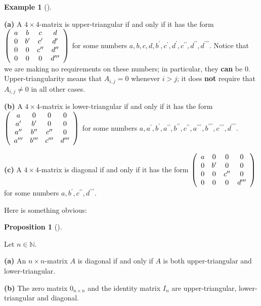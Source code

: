 \documentclass[numbers=enddot,12pt,final,onecolumn,notitlepage]{scrartcl}%
\theoremstyle{definition}
\newtheorem{prop}[theo]{Proposition}
\newenvironment{proposition}[1][]
{\begin{prop}[#1]\begin{leftbar}}
{\end{leftbar}\end{prop}}
\newtheorem{exam}[theo]{Example}
\newenvironment{example}[1][]
{\begin{exam}[#1]\begin{leftbar}}
{\end{leftbar}\end{exam}}
\begin{document}
\begin{example}
\label{exam.triangular}\textbf{(a)} A $4\times4$-matrix is upper-triangular if
and only if it has the form $\left(
\begin{array}
[c]{cccc}%
a & b & c & d\\
0 & b^{\prime} & c^{\prime} & d^{\prime}\\
0 & 0 & c^{\prime\prime} & d^{\prime\prime}\\
0 & 0 & 0 & d^{\prime\prime\prime}%
\end{array}
\right)  $ for some numbers $a,b,c,d,b^{\prime},c^{\prime},d^{\prime
},c^{\prime\prime},d^{\prime\prime},d^{\prime\prime\prime}$. Notice that we
are making no requirements on these numbers; in particular, they \textbf{can}
be $0$. Upper-triangularity means that $A_{i,j}=0$ whenever $i>j$; it does
\textbf{not} require that $A_{i,j}\neq0$ in all other cases.

\textbf{(b)} A $4\times4$-matrix is lower-triangular if and only if it has the
form $\left(
\begin{array}
[c]{cccc}%
a & 0 & 0 & 0\\
a^{\prime} & b^{\prime} & 0 & 0\\
a^{\prime\prime} & b^{\prime\prime} & c^{\prime\prime} & 0\\
a^{\prime\prime\prime} & b^{\prime\prime\prime} & c^{\prime\prime\prime} &
d^{\prime\prime\prime}%
\end{array}
\right)  $ for some numbers $a,a^{\prime},b^{\prime},a^{\prime\prime
},b^{\prime\prime},c^{\prime\prime},a^{\prime\prime\prime},b^{\prime
\prime\prime},c^{\prime\prime\prime},d^{\prime\prime\prime}$.

\textbf{(c)} A $4\times4$-matrix is diagonal if and only if it has the form
$\left(
\begin{array}
[c]{cccc}%
a & 0 & 0 & 0\\
0 & b^{\prime} & 0 & 0\\
0 & 0 & c^{\prime\prime} & 0\\
0 & 0 & 0 & d^{\prime\prime\prime}%
\end{array}
\right)  $ for some numbers $a,b^{\prime},c^{\prime\prime},d^{\prime
\prime\prime}$.
\end{example}

Here is something obvious:

\begin{proposition}
\label{prop.triangular.obvious}Let $n\in\mathbb{N}$.

\textbf{(a)} An $n\times n$-matrix $A$ is diagonal if and only if $A$ is both
upper-triangular and lower-triangular.

\textbf{(b)} The zero matrix $0_{n\times n}$ and the identity matrix $I_{n}$
are upper-triangular, lower-triangular and diagonal.
\end{proposition}
\end{document}
